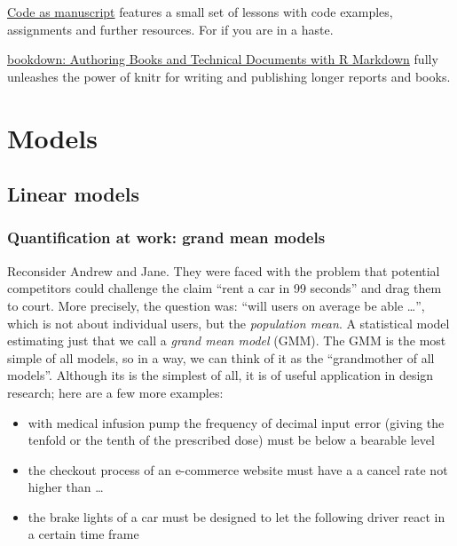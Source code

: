 \documentclass[]{svmono}
\providecommand{\tightlist}{%
  \setlength{\itemsep}{0pt}\setlength{\parskip}{0pt}}
\theoremstyle{definition}
\theoremstyle{definition}
\theoremstyle{definition}
\theoremstyle{remark}
\begin{document}
\href{http://codeasmanuscript.org/lessons/}{Code as manuscript} features
a small set of lessons with code examples, assignments and further
resources. For if you are in a haste.

\href{https://bookdown.org/yihui/bookdown/}{bookdown: Authoring Books
and Technical Documents with R Markdown} fully unleashes the power of
knitr for writing and publishing longer reports and books.

\part{Models}\label{part-models}

\chapter{Linear models}\label{linear_models}

\section{Quantification at work: grand mean
models}\label{quantification-at-work-grand-mean-models}

Reconsider Andrew and Jane. They were faced with the problem that
potential competitors could challenge the claim ``rent a car in 99
seconds'' and drag them to court. More precisely, the question was:
``will users on average be able \ldots{}'', which is not about
individual users, but the \emph{population mean}. A statistical model
estimating just that we call a \emph{grand mean model} (GMM). The GMM is
the most simple of all models, so in a way, we can think of it as the
``grandmother of all models''. Although its is the simplest of all, it
is of useful application in design research; here are a few more
examples:

\begin{itemize}
\tightlist
\item
  with medical infusion pump the frequency of decimal input error
  (giving the tenfold or the tenth of the prescribed dose) must be below
  a bearable level
\item
  the checkout process of an e-commerce website must have a a cancel
  rate not higher than \ldots{}
\item
  the brake lights of a car must be designed to let the following driver
  react in a certain time frame
\end{itemize}
\end{document}
